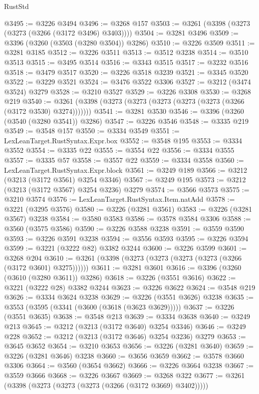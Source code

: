 \begin{lexlean}{RustStd}
\begin{coremodule}
{\begin{coremodule}
{{{{{{{{{{{{{{{{{{{{{{{{{{@3495 := @3226 @3494
@3496 := @3268 @157
@3503 := @3261 (@3398 (@3273 (@3273 (@3266 (@3172 @3496) @3403))))
@3504 := @3281 @3496
@3509 := @3396 (@3260 (@3503 (@3280 @3504)) @3286)
@3510 := @3226 @3509
@3511 := @3281 @3185
@3512 := @3226 @3511
@3513 := @3512 @3238
@3514 := @3510 @3513
@3515 := @3495 @3514
@3516 := @3343 @3515
@3517 := @3232 @3516
@3518 := @3479 @3517
@3520 := @3226 @3518 @3239
@3521 := @3345 @3520
@3522 := @3229 @3521
@3524 := @3476 @3522 @3306
@3527 := @3212 (@3474 @3524) @3279
@3528 := @3210 @3527
@3529 := @3226 @3308
@3530 := @3268 @219
@3540 := @3261 (@3398 (@3273 (@3273 (@3273 (@3273 (@3273 (@3266 (@3172 @3530) @3274)))))))
@3541 := @3281 @3530
@3546 := @3396 (@3260 (@3540 (@3280 @3541)) @3286)
@3547 := @3226 @3546
@3548 := @3335 @219
@3549 := @3548 @157
@3550 := @3334 @3549
@3551 := LexLeanTarget.RustSyntax.Expr.box
@3552 := @3548 @195
@3553 := @3334 @3552
@3554 := @3335 @22
@3555 := @3554 @22
@3556 := @3334 @3555
@3557 := @3335 @57
@3558 := @3557 @22
@3559 := @3334 @3558
@3560 := LexLeanTarget.RustSyntax.Expr.block
@3561 := @3249 @189
@3566 := @3212 (@3213 (@3172 @3561) @3254 @3346)
@3567 := @3249 @195
@3573 := @3212 (@3213 (@3172 @3567) @3254 @3236) @3279
@3574 := @3566 @3573
@3575 := @3210 @3574
@3576 := LexLeanTarget.RustSyntax.Item.natAdd
@3578 := @3221 (@3295 @3576)
@3580 := @3226 (@3281 @3561)
@3583 := @3226 (@3281 @3567) @3238
@3584 := @3580 @3583
@3586 := @3578 @3584 @3306
@3588 := @3560 (@3575 @3586)
@3590 := @3226 @3588 @3238
@3591 := @3559 @3590
@3593 := @3226 @3591 @3238
@3594 := @3556 @3593
@3595 := @3226 @3594
@3599 := @3221 (@3222 @82) @3382 @3244
@3600 := @3226 @3599
@3601 := @3268 @204
@3610 := @3261 (@3398 (@3273 (@3273 (@3273 (@3273 (@3266 (@3172 @3601) @3275))))))
@3611 := @3281 @3601
@3616 := @3396 (@3260 (@3610 (@3280 @3611)) @3286)
@3618 := @3226 (@3551 @3616)
@3622 := @3221 (@3222 @28) @3382 @3244
@3623 := @3226 @3622
@3624 := @3548 @219
@3626 := @3334 @3624 @3238
@3629 := @3226 (@3551 @3626) @3238
@3635 := @3553 (@3595 (@3341 (@3600 (@3618 (@3623 @3629)))))
@3637 := @3226 (@3551 @3635)
@3638 := @3548 @213
@3639 := @3334 @3638
@3640 := @3249 @213
@3645 := @3212 (@3213 (@3172 @3640) @3254 @3346)
@3646 := @3249 @228
@3652 := @3212 (@3213 (@3172 @3646) @3254 @3236) @3279
@3653 := @3645 @3652
@3654 := @3210 @3653
@3656 := @3226 (@3281 @3640)
@3659 := @3226 (@3281 @3646) @3238
@3660 := @3656 @3659
@3662 := @3578 @3660 @3306
@3664 := @3560 (@3654 @3662)
@3666 := @3226 @3664 @3238
@3667 := @3559 @3666
@3668 := @3226 @3667
@3669 := @3268 @322
@3677 := @3261 (@3398 (@3273 (@3273 (@3273 (@3266 (@3172 @3669) @3402)))))
}}}}}}}}}}}}}}}}}}}}}}}}}}
\end{coremodule}}
\end{coremodule}
\end{lexlean}
